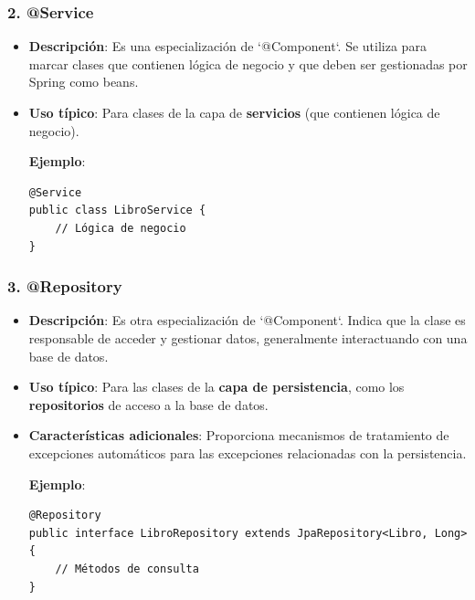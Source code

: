 \documentclass[11pt]{article}
\begin{document}
\subsubsection{2. \textbf{\textbf{@Service}}}
\label{sec:orgc9a6de3}
\begin{itemize}
\item \textbf{\textbf{Descripción}}: Es una especialización de `@Component`. Se utiliza para marcar clases que contienen lógica de negocio y que deben ser gestionadas por Spring como beans.
\item \textbf{\textbf{Uso típico}}: Para clases de la capa de \textbf{\textbf{servicios}} (que contienen lógica de negocio).

\textbf{\textbf{Ejemplo}}:
\begin{verbatim}
@Service
public class LibroService {
    // Lógica de negocio
}
\end{verbatim}
\end{itemize}

\subsubsection{3. \textbf{\textbf{@Repository}}}
\label{sec:org52617f6}
\begin{itemize}
\item \textbf{\textbf{Descripción}}: Es otra especialización de `@Component`. Indica que la clase es responsable de acceder y gestionar datos, generalmente interactuando con una base de datos.
\item \textbf{\textbf{Uso típico}}: Para las clases de la \textbf{\textbf{capa de persistencia}}, como los \textbf{\textbf{repositorios}} de acceso a la base de datos.
\item \textbf{\textbf{Características adicionales}}: Proporciona mecanismos de tratamiento de excepciones automáticos para las excepciones relacionadas con la persistencia.

\textbf{\textbf{Ejemplo}}:
\begin{verbatim}
@Repository
public interface LibroRepository extends JpaRepository<Libro, Long> {
    // Métodos de consulta
}
\end{verbatim}
\end{itemize}
\end{document}
